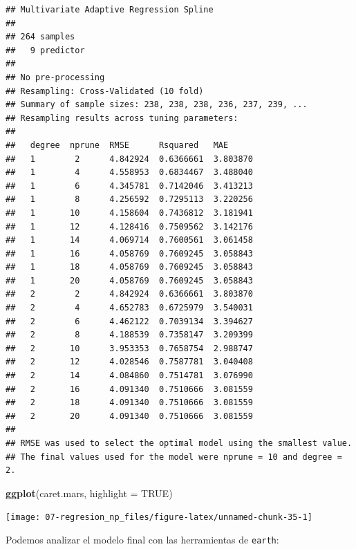 \documentclass[
  spanish,
]{book}
\newenvironment{Shaded}{\begin{snugshade}}{\end{snugshade}}
\newcommand{\DataTypeTok}[1]{\textcolor[rgb]{0.13,0.29,0.53}{#1}}
\newcommand{\KeywordTok}[1]{\textcolor[rgb]{0.13,0.29,0.53}{\textbf{#1}}}
\newcommand{\NormalTok}[1]{#1}
\newcommand{\OperatorTok}[1]{\textcolor[rgb]{0.81,0.36,0.00}{\textbf{#1}}}
\newcommand{\OtherTok}[1]{\textcolor[rgb]{0.56,0.35,0.01}{#1}}
\theoremstyle{break}
\theoremstyle{definition}
\theoremstyle{definition}
\theoremstyle{definition}
\theoremstyle{remark}
\begin{document}
\begin{verbatim}
## Multivariate Adaptive Regression Spline 
## 
## 264 samples
##   9 predictor
## 
## No pre-processing
## Resampling: Cross-Validated (10 fold) 
## Summary of sample sizes: 238, 238, 238, 236, 237, 239, ... 
## Resampling results across tuning parameters:
## 
##   degree  nprune  RMSE      Rsquared   MAE     
##   1        2      4.842924  0.6366661  3.803870
##   1        4      4.558953  0.6834467  3.488040
##   1        6      4.345781  0.7142046  3.413213
##   1        8      4.256592  0.7295113  3.220256
##   1       10      4.158604  0.7436812  3.181941
##   1       12      4.128416  0.7509562  3.142176
##   1       14      4.069714  0.7600561  3.061458
##   1       16      4.058769  0.7609245  3.058843
##   1       18      4.058769  0.7609245  3.058843
##   1       20      4.058769  0.7609245  3.058843
##   2        2      4.842924  0.6366661  3.803870
##   2        4      4.652783  0.6725979  3.540031
##   2        6      4.462122  0.7039134  3.394627
##   2        8      4.188539  0.7358147  3.209399
##   2       10      3.953353  0.7658754  2.988747
##   2       12      4.028546  0.7587781  3.040408
##   2       14      4.084860  0.7514781  3.076990
##   2       16      4.091340  0.7510666  3.081559
##   2       18      4.091340  0.7510666  3.081559
##   2       20      4.091340  0.7510666  3.081559
## 
## RMSE was used to select the optimal model using the smallest value.
## The final values used for the model were nprune = 10 and degree = 2.
\end{verbatim}

\begin{Shaded}
\begin{Highlighting}[]
\KeywordTok{ggplot}\NormalTok{(caret.mars, }\DataTypeTok{highlight =} \OtherTok{TRUE}\NormalTok{)}
\end{Highlighting}
\end{Shaded}

\begin{center}\texttt{[image: 07-regresion\_np\_files/figure-latex/unnamed-chunk-35-1]} \end{center}

Podemos analizar el modelo final con las herramientas de \texttt{earth}:

\begin{Shaded}
\end{Shaded}
\end{document}
